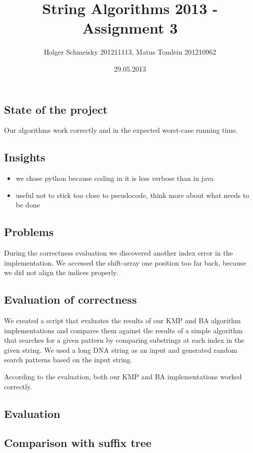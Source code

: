 \documentclass[a4paper,10pt]{article}
\title{String Algorithms 2013 - Assignment 3}
\author{Holger Schmeisky  201211113, Matus Tomlein 201210962}
\date{29.05.2013}
\begin{document}
\maketitle

\subsection*{State of the project}
Our algorithms work correctly and in the expected worst-case running time.

\subsection*{Insights}
\begin{itemize}
  \item we chose python because coding in it is less verbose than in java
  \item useful not to stick too close to pseudocode, think more about what needs to be done
\end{itemize}

\subsection*{Problems}
During the correctness evaluation we discovered another index error in the implementation. We accessed the shift-array one position too far back, because we did not align the indices properly.

\subsection*{Evaluation of correctness}

We created a script that evaluates the results of our KMP and BA algorithm
implementations and compares them against the results of a simple algorithm
that searches for a given pattern by comparing substrings at each index
in the given string.
We used a long DNA string as an input and generated random search patterns
based on the input string.

According to the evaluation, both our KMP and BA implementations worked
correctly.

\clearpage
\subsection*{Evaluation}

\subsection*{Comparison with suffix tree}
\end{document}
